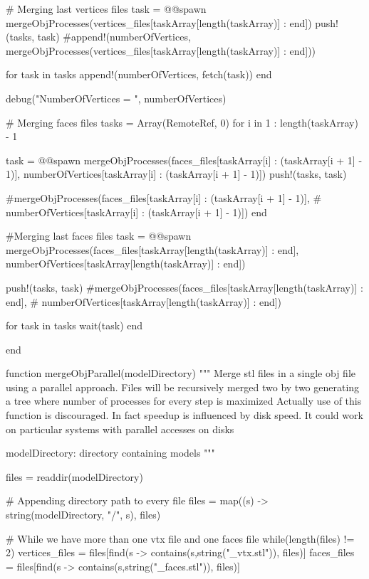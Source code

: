 \documentclass[11pt,oneside]{article}	%
\begin{document}
{  # Merging last vertices files
  task = @@spawn mergeObjProcesses(vertices_files[taskArray[length(taskArray)] : end])
  push!(tasks, task)
  #append!(numberOfVertices, mergeObjProcesses(vertices_files[taskArray[length(taskArray)] : end]))


  for task in tasks
    append!(numberOfVertices, fetch(task))
  end

  debug("NumberOfVertices = ", numberOfVertices)

  # Merging faces files
  tasks = Array(RemoteRef, 0)
  for i in 1 : length(taskArray) - 1

    task = @@spawn mergeObjProcesses(faces_files[taskArray[i] : (taskArray[i + 1] - 1)],
                                    numberOfVertices[taskArray[i] : (taskArray[i + 1] - 1)])
    push!(tasks, task)

    #mergeObjProcesses(faces_files[taskArray[i] : (taskArray[i + 1] - 1)],
    #                  numberOfVertices[taskArray[i] : (taskArray[i + 1] - 1)])
  end

  #Merging last faces files
  task = @@spawn mergeObjProcesses(faces_files[taskArray[length(taskArray)] : end],
                                  numberOfVertices[taskArray[length(taskArray)] : end])

  push!(tasks, task)
  #mergeObjProcesses(faces_files[taskArray[length(taskArray)] : end],
  #                    numberOfVertices[taskArray[length(taskArray)] : end])

  for task in tasks
    wait(task)
  end

end

function mergeObjParallel(modelDirectory)
  """
  Merge stl files in a single obj file using a parallel
  approach. Files will be recursively merged two by two
  generating a tree where number of processes for every
  step is maximized
  Actually use of this function is discouraged. In fact
  speedup is influenced by disk speed. It could work on
  particular systems with parallel accesses on disks

  modelDirectory: directory containing models
  """

  files = readdir(modelDirectory)

  # Appending directory path to every file
  files = map((s) -> string(modelDirectory, "/", s), files)

  # While we have more than one vtx file and one faces file
  while(length(files) != 2)
    vertices_files = files[find(s -> contains(s,string("_vtx.stl")), files)]
    faces_files = files[find(s -> contains(s,string("_faces.stl")), files)]

}
\end{document}

